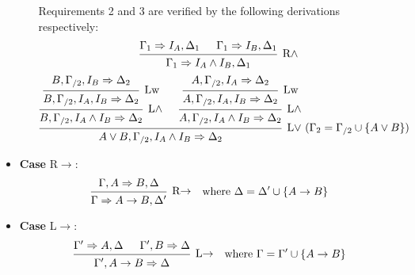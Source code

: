 \documentclass[a4paper]{article}
\begin{document}
\begin{itemize}
\begin{enumerate}
    Requirements 2 and 3 are verified by the following derivations respectively:
    \[
      \begin{prooftree}
        \hypo{\Gamma_1 \Rightarrow I_A,\Delta_1}
        \hypo{\Gamma_1 \Rightarrow I_B,\Delta_1}
        \infer2[R$\wedge$]{\Gamma_1 \Rightarrow I_A \wedge I_B, \Delta_1}
      \end{prooftree}
    \]
    \[
      \begin{prooftree}
        \hypo{B, \Gamma_{/2}, I_B \Rightarrow \Delta_2}
        \infer1[Lw]{B, \Gamma_{/2}, I_A, I_B \Rightarrow \Delta_2}
        \infer1[L$\wedge$]{B, \Gamma_{/2}, I_A \wedge I_B \Rightarrow \Delta_2}
        \hypo{A, \Gamma_{/2}, I_A \Rightarrow \Delta_2}
        \infer1[Lw]{A, \Gamma_{/2}, I_A, I_B \Rightarrow \Delta_2}
        \infer1[L$\wedge$]{A, \Gamma_{/2}, I_A \wedge I_B \Rightarrow \Delta_2}
        \infer2[L$\vee$ ($\Gamma_2 = \Gamma_{/2} \cup \{A \vee B\}$)]{A \vee B, \Gamma_{/2}, I_A \wedge I_B \Rightarrow \Delta_2}
      \end{prooftree}
    \]
  \end{enumerate}
\item \textbf{Case} R$\to$:
  \begin{align*}
    \begin{prooftree}
      \hypo{\Gamma, A \Rightarrow B, \Delta}
      \infer1[R$\to$]{\Gamma \Rightarrow A \to B, \Delta'}
    \end{prooftree}
    && \text{where $\Delta = \Delta' \cup \{A \to B\}$}
  \end{align*}
\item \textbf{Case} L$\to$:
  \begin{align*}
    \begin{prooftree}
      \hypo{\Gamma' \Rightarrow A, \Delta}
      \hypo{\Gamma', B \Rightarrow \Delta}
      \infer2[L$\to$]{\Gamma', A \to B \Rightarrow \Delta}
    \end{prooftree}
    && \text{where $\Gamma = \Gamma' \cup \{A \to B\}$}
  \end{align*}
\end{itemize}

% 
% 
\end{document}
